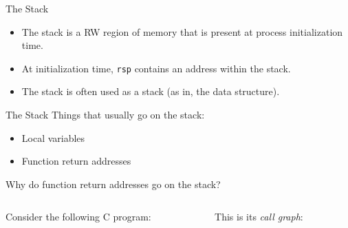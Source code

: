 \documentclass[hyphens,aspectratio=169]{beamer}
\begin{document}
\begin{frame}[fragile]{The Stack}
    \begin{itemize}
        \pause \item The stack is a RW region of memory that is present at process initialization time.
        \pause \item At initialization time, \texttt{rsp} contains an address within the stack.
        \pause \item The stack is often used as a stack (as in, the data structure).
    \end{itemize}
\end{frame}

\begin{frame}[fragile]{The Stack}
    Things that usually go on the stack:
    \begin{itemize}
        \pause \item Local variables
        \pause \item Function return addresses
    \end{itemize}
\end{frame}

\begin{frame}[fragile]{Why do function return addresses go on the stack?}
    \begin{columns}
        \begin{column}{0.5\textwidth}
            Consider the following C program:
                \inputminted[fontsize=\tiny]{c}{call.c}
        \end{column}
        \begin{column}{0.5\textwidth}
            \pause This is its \textit{call graph}:
            \vspace{1cm}

        \end{column}
    \end{columns}
\end{frame}
\end{document}

